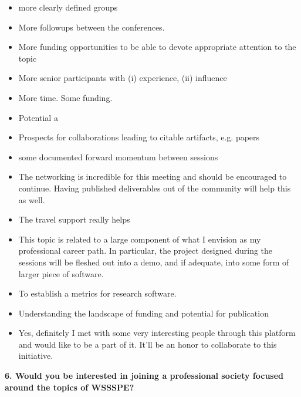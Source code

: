 \begin{itemize}
\item more clearly defined groups
\item More followups between the conferences.
\item More funding opportunities to be able to devote appropriate attention to the topic
\item More senior participants with (i) experience, (ii) influence
\item More time. Some funding.
\item Potential a
\item Prospects for collaborations leading to citable artifacts, e.g. papers
\item some documented forward momentum between sessions
\item The networking is incredible for this meeting and should be encouraged to continue. Having published deliverables out of the community will help this as well.
\item The travel support really helps
\item This topic is related to a large component of what I envision as my professional career path. In particular, the project designed during the sessions will be fleshed out into a demo, and if adequate, into some form of larger piece of software.
\item To establish a metrics for research software.
\item Understanding the landscape of funding and potential for publication
\item Yes, definitely I met with some very interesting people through this platform and would like to be a part of it. It'll be an honor to collaborate to this initiative.
\end{itemize}


\noindent \textbf{6. Would you be interested in joining a professional society focused around the topics of WSSSPE?}

